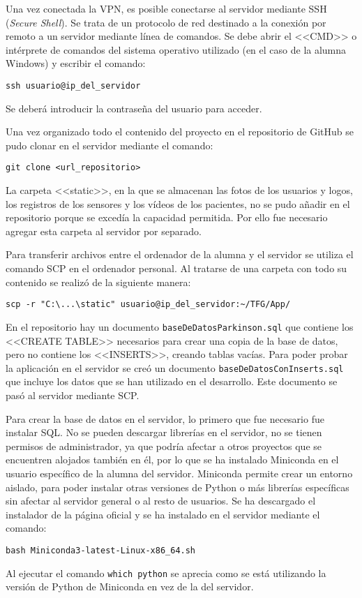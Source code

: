 Una vez conectada la VPN, es posible conectarse al servidor mediante SSH (\textit{Secure Shell}). Se trata de un protocolo de red destinado a la conexión por remoto a un servidor mediante línea de comandos. Se debe abrir el <<CMD>> o intérprete de comandos del sistema operativo utilizado (en el caso de la alumna Windows) y escribir el comando:
\begin{verbatim}ssh usuario@ip_del_servidor\end{verbatim}
Se deberá introducir la contraseña del usuario para acceder.


Una vez organizado todo el contenido del proyecto en el repositorio de GitHub se pudo clonar en el servidor mediante el comando:
\begin{verbatim}git clone <url_repositorio>\end{verbatim}

La carpeta <<static>>, en la que se almacenan las fotos de los usuarios y logos, los registros de los sensores y los vídeos de los pacientes, no se pudo añadir en el repositorio porque se excedía la capacidad permitida. Por ello fue necesario agregar esta carpeta al servidor por separado.

Para transferir archivos entre el ordenador de la alumna y el servidor se utiliza el comando SCP en el ordenador personal. Al tratarse de una carpeta con todo su contenido se realizó de la siguiente manera:
\begin{verbatim}scp -r "C:\...\static" usuario@ip_del_servidor:~/TFG/App/\end{verbatim}


En el repositorio hay un documento \texttt{baseDeDatosParkinson.sql} que contiene los <<CREATE TABLE>> necesarios para crear una copia de la base de datos, pero no contiene los <<INSERTS>>, creando tablas vacías. Para poder probar la aplicación en el servidor se creó un documento \texttt{baseDeDatosConInserts.sql} que incluye los datos que se han utilizado en el desarrollo. Este documento se pasó al servidor mediante SCP.

Para crear la base de datos en el servidor, lo primero que fue necesario fue instalar SQL.
No se pueden descargar librerías en el servidor, no se tienen permisos de administrador, ya que podría afectar a otros proyectos que se encuentren alojados también en él, por lo que se ha instalado Miniconda en el usuario específico de la alumna del servidor. 
Miniconda permite crear un entorno aislado, para poder instalar otras versiones de Python o más librerías específicas sin afectar al servidor general o al resto de usuarios.
Se ha descargado el instalador de la página oficial y se ha instalado en el servidor mediante el comando:
\begin{verbatim}bash Miniconda3-latest-Linux-x86_64.sh\end{verbatim}
Al ejecutar el comando \texttt{which python} se aprecia como se está utilizando la versión de Python de Miniconda en vez de la del servidor.

